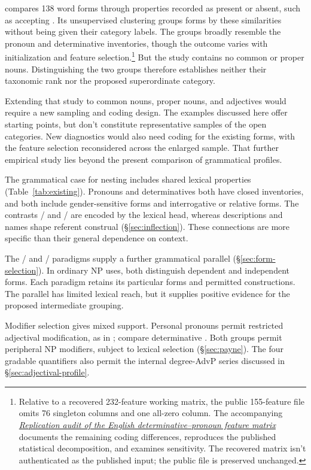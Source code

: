 \documentclass[12pt]{article}
\begin{document}
\textcite{reynolds2021} compares 138 word forms through properties recorded as present or absent, such as accepting . Its unsupervised clustering groups forms by these similarities without being given their category labels. The groups broadly resemble the pronoun and determinative inventories, though the outcome varies with initialization and feature selection.\footnote{Relative to a recovered 232-feature working matrix, the public 155-feature file omits 76 singleton columns and one all-zero column. The accompanying \href{run:matrix-audit.pdf}{\textit{Replication audit of the English determinative--pronoun feature matrix}} documents the remaining coding differences, reproduces the published statistical decomposition, and examines sensitivity. The recovered matrix isn't authenticated as the published input; the public file is preserved unchanged.} But the study contains no common or proper nouns. Distinguishing the two groups therefore establishes neither their taxonomic rank nor the proposed superordinate category.

Extending that study to common nouns, proper nouns, and adjectives would require a new sampling and coding design. The examples discussed here offer starting points, but don't constitute representative samples of the open categories. New diagnostics would also need coding for the existing forms, with the feature selection reconsidered across the enlarged sample. That further empirical study lies beyond the present comparison of grammatical profiles.

The grammatical case for nesting includes shared lexical properties (Table~\ref{tab:existing}). Pronouns and determinatives both have closed inventories, and both include gender-sensitive forms and interrogative or relative forms. The contrasts / and / are encoded by the lexical head, whereas descriptions and names shape referent construal (§\ref{sec:inflection}). These connections are more specific than their general dependence on context.

The / and / paradigms supply a further grammatical parallel (§\ref{sec:form-selection}). In ordinary NP uses, both distinguish dependent and independent forms. Each paradigm retains its particular forms and permitted constructions. The parallel has limited lexical reach, but it supplies positive evidence for the proposed intermediate grouping.

Modifier selection gives mixed support. Personal pronouns permit restricted adjectival modification, as in  \citep[429--430]{huddleston2002}; compare determinative . Both groups permit peripheral NP modifiers, subject to lexical selection (§\ref{sec:payne}). The four gradable quantifiers also permit the internal degree-AdvP series discussed in §\ref{sec:adjectival-profile}.
\end{document}
